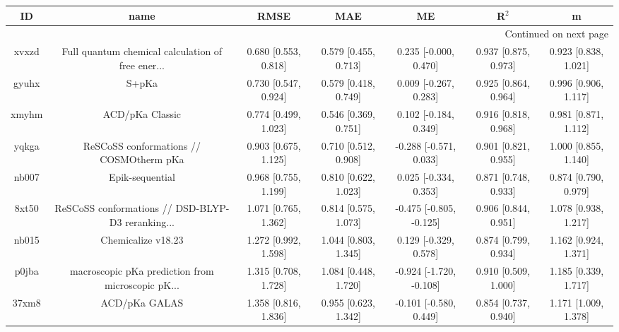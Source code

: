 \documentclass{article}
\begin{document}
\begin{center}
\begin{longtable}{|ccccccc|}
\toprule
    ID &                                               name &                  RMSE &                   MAE &                       ME &                 R$^2$ &                      m \\
\midrule
\endhead
\midrule
\multicolumn{7}{r}{{Continued on next page}} \\
\midrule
\endfoot

\bottomrule
\endlastfoot
 xvxzd &  Full quantum chemical calculation of free ener... &  0.680 [0.553, 0.818] &  0.579 [0.455, 0.713] &    0.235 [-0.000, 0.470] &  0.937 [0.875, 0.973] &   0.923 [0.838, 1.021] \\
 gyuhx &                                              S+pKa &  0.730 [0.547, 0.924] &  0.579 [0.418, 0.749] &    0.009 [-0.267, 0.283] &  0.925 [0.864, 0.964] &   0.996 [0.906, 1.117] \\
 xmyhm &                                    ACD/pKa Classic &  0.774 [0.499, 1.023] &  0.546 [0.369, 0.751] &    0.102 [-0.184, 0.349] &  0.916 [0.818, 0.968] &   0.981 [0.871, 1.112] \\
 yqkga &            ReSCoSS conformations // COSMOtherm pKa &  0.903 [0.675, 1.125] &  0.710 [0.512, 0.908] &   -0.288 [-0.571, 0.033] &  0.901 [0.821, 0.955] &   1.000 [0.855, 1.140] \\
 nb007 &                                    Epik-sequential &  0.968 [0.755, 1.199] &  0.810 [0.622, 1.023] &    0.025 [-0.334, 0.353] &  0.871 [0.748, 0.933] &   0.874 [0.790, 0.979] \\
 8xt50 &  ReSCoSS conformations // DSD-BLYP-D3 reranking... &  1.071 [0.765, 1.362] &  0.814 [0.575, 1.073] &  -0.475 [-0.805, -0.125] &  0.906 [0.844, 0.951] &   1.078 [0.938, 1.217] \\
 nb015 &                                 Chemicalize v18.23 &  1.272 [0.992, 1.598] &  1.044 [0.803, 1.345] &    0.129 [-0.329, 0.578] &  0.874 [0.799, 0.934] &   1.162 [0.924, 1.371] \\
 p0jba &  macroscopic pKa prediction from microscopic pK... &  1.315 [0.708, 1.728] &  1.084 [0.448, 1.720] &  -0.924 [-1.720, -0.108] &  0.910 [0.509, 1.000] &   1.185 [0.339, 1.717] \\
 37xm8 &                                      ACD/pKa GALAS &  1.358 [0.816, 1.836] &  0.955 [0.623, 1.342] &   -0.101 [-0.580, 0.449] &  0.854 [0.737, 0.940] &   1.171 [1.009, 1.378] \\

\end{longtable}
\end{center}
\end{document}
